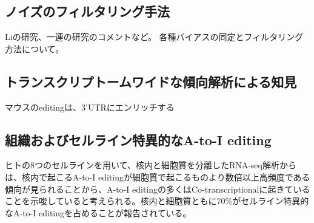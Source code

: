 \subsection{ノイズのフィルタリング手法}
Liの研究、一連の研究のコメントなど。
各種バイアスの同定とフィルタリング方法について。

\subsection{トランスクリプトームワイドな傾向解析による知見}
マウスのeditingは、3'UTRにエンリッチする

\subsection{組織およびセルライン特異的なA-to-I editing}
ヒトの8つのセルラインを用いて、核内と細胞質を分離したRNA-seq解析からは、核内で起こるA-to-I editingが細胞質で起こるものより数倍以上高頻度である傾向が見られることから、A-to-I editingの多くはCo-transcriptionalに起きていることを示唆していると考えられる。核内と細胞質ともに70\%がセルライン特異的なA-to-I editingを占めることが報告されている。


